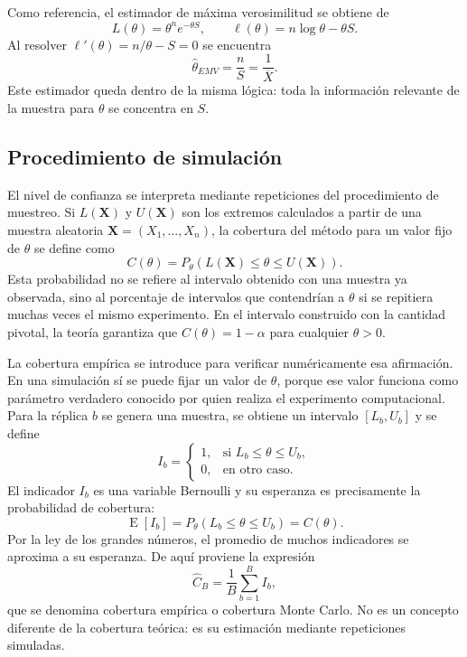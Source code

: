 \documentclass[10pt,a4paper,oneside]{article}
\newcommand{\E}{\operatorname{E}}
\begin{document}
Como referencia, el estimador de máxima verosimilitud se obtiene de
\begin{equation*}
L(\theta)=\theta^n e^{-\theta S},
\qquad
\ell(\theta)=n\log\theta-\theta S.
\end{equation*}
Al resolver $\ell'(\theta)=n/\theta-S=0$ se encuentra
\begin{equation*}
\widehat\theta_{EMV}=\frac{n}{S}=\frac{1}{\overline X}.
\end{equation*}
Este estimador queda dentro de la misma lógica: toda la información relevante de la muestra para $\theta$ se concentra en $S$.

\subsection*{Procedimiento de simulación}

El nivel de confianza se interpreta mediante repeticiones del procedimiento de muestreo. Si $L(\mathbf X)$ y $U(\mathbf X)$ son los extremos calculados a partir de una muestra aleatoria $\mathbf X=(X_1,\ldots,X_n)$, la cobertura del método para un valor fijo de $\theta$ se define como
\begin{equation}
C(\theta)=P_\theta\!\left(L(\mathbf X)\leq\theta\leq U(\mathbf X)\right).
\label{eq:cobertura-p1}
\end{equation}
Esta probabilidad no se refiere al intervalo obtenido con una muestra ya observada, sino al porcentaje de intervalos que contendrían a $\theta$ si se repitiera muchas veces el mismo experimento. En el intervalo construido con la cantidad pivotal, la teoría garantiza que $C(\theta)=1-\alpha$ para cualquier $\theta>0$.

La cobertura empírica se introduce para verificar numéricamente esa afirmación. En una simulación sí se puede fijar un valor de $\theta$, porque ese valor funciona como parámetro verdadero conocido por quien realiza el experimento computacional. Para la réplica $b$ se genera una muestra, se obtiene un intervalo $[L_b,U_b]$ y se define
\begin{equation*}
I_b=
\begin{cases}
1, & \text{si }L_b\leq\theta\leq U_b,\\
0, & \text{en otro caso}.
\end{cases}
\end{equation*}
El indicador $I_b$ es una variable Bernoulli y su esperanza es precisamente la probabilidad de cobertura:
\begin{equation*}
\E[I_b]=P_\theta(L_b\leq\theta\leq U_b)=C(\theta).
\end{equation*}
Por la ley de los grandes números, el promedio de muchos indicadores se aproxima a su esperanza. De aquí proviene la expresión
\begin{equation}
\widehat C_B=\frac{1}{B}\sum_{b=1}^{B}I_b,
\label{eq:cob-emp-p1}
\end{equation}
que se denomina cobertura empírica o cobertura Monte Carlo. No es un concepto diferente de la cobertura teórica: es su estimación mediante repeticiones simuladas.
\end{document}
